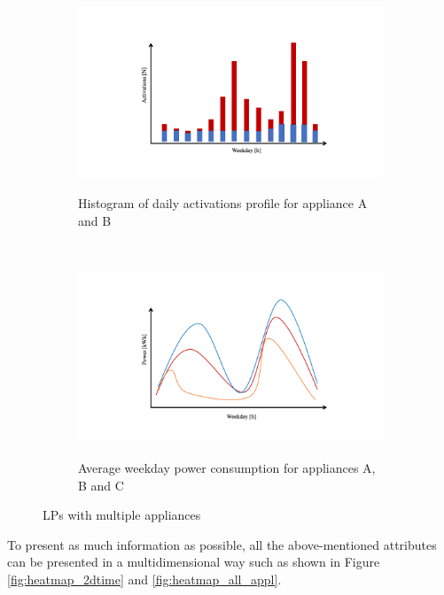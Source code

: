 \begin{figure}[H]
	\begin{subfigure}{.5\textwidth}
		\caption{Histogram of daily activations profile for appliance A and B}
		\includegraphics[width=1.1\textwidth]{Figures/profile_sketches/Slide8.png}
		\label{fig:daily_act_m_profile}
	\end{subfigure}%
	~ 
	\begin{subfigure}{.5\textwidth}
		\caption{Average weekday power consumption for appliances A, B and C}
		\includegraphics[width=1.1\textwidth]{Figures/profile_sketches/Slide2.png}
		\label{fig:daily_power_m_profile}
	\end{subfigure}%
	\label{fig:daily_m_profile}
	\caption{LPs with multiple appliances}
\end{figure}

To present as much information as possible,
all the above-mentioned attributes can be presented in a multidimensional way such as shown in Figure \ref{fig:heatmap_2dtime} and \ref{fig:heatmap_all_appl}.

